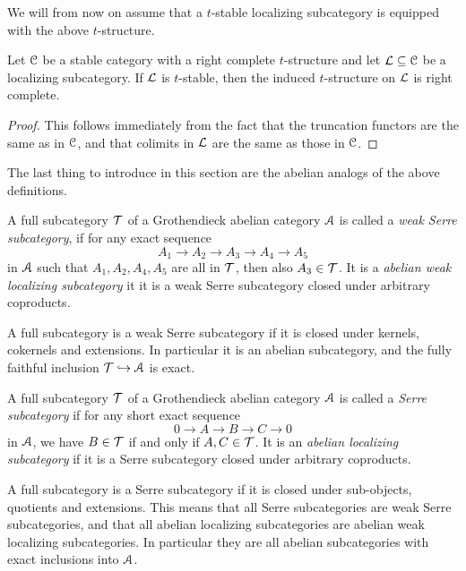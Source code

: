 We will from now on assume that a $t$-stable localizing subcategory is equipped with the above $t$-structure. 

\begin{proposition}
    \label{ch3:prop:induced-t-structure-on-stable-localizing}
    Let $\EuScript{C}$ be a stable category with a right complete $t$-structure and let $\mathcal{L}\subseteq \EuScript{C}$ be a localizing subcategory. If $\mathcal{L}$ is $t$-stable, then the induced $t$-structure on $\mathcal{L}$ is right complete.  
\end{proposition}
\begin{proof}
    This follows immediately from the fact that the truncation functors are the same as in $\EuScript{C}$, and that colimits in $\mathcal{L}$ are the same as those in $\EuScript{C}$. 
\end{proof}

The last thing to introduce in this section are the abelian analogs of the above definitions. 

\begin{definition}
    A full subcategory $\mathcal{T}$ of a Grothendieck abelian category $\EuScript{A}$ is called a \emph{weak Serre subcategory}, if for any exact sequence 
    \[A_1 \to A_2 \to A_3 \to A_4 \to A_5\]
    in $\EuScript{A}$ such that $A_1, A_2, A_4, A_5$ are all in $\mathcal{T}$, then also $A_3 \in \mathcal{T}$. It is a \emph{abelian weak localizing subcategory} it it is a weak Serre subcategory closed under arbitrary coproducts. 
\end{definition}

\begin{remark}
    A full subcategory is a weak Serre subcategory if it is closed under kernels, cokernels and extensions. In particular it is an abelian subcategory, and the fully faithful inclusion $\mathcal{T}\hookrightarrow \EuScript{A}$ is exact. 
\end{remark}

\begin{definition}
    A full subcategory $\mathcal{T}$ of a Grothendieck abelian category $\EuScript{A}$ is called a \emph{Serre subcategory} if for any short exact sequence 
    \[0\to A\to B\to C\to 0\]
    in $\EuScript{A}$, we have $B\in \mathcal{T}$ if and only if $A, C \in \mathcal{T}$. It is an \emph{abelian localizing subcategory} if it is a Serre subcategory closed under arbitrary coproducts. 
\end{definition}

\begin{remark}
    A full subcategory is a Serre subcategory if it is closed under sub-objects, quotients and extensions. This means that all Serre subcategories are weak Serre subcategories, and that all abelian localizing subcategories are abelian weak localizing subcategories. In particular they are all abelian subcategories with exact inclusions into $\EuScript{A}$. 
\end{remark}

